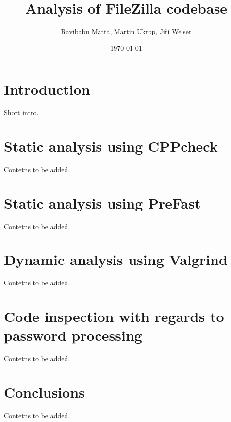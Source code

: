 \documentclass[11pt]{article}
\begin{document}
\title{Analysis of FileZilla codebase}
\date{\today}
\author{Ravibabu Matta, Martin Ukrop, Jiří Weiser}
\maketitle

\section{Introduction}

Short intro.

\section{Static analysis using CPPcheck}

Contetns to be added.

\section{Static analysis using PreFast}

Contetns to be added.

\section{Dynamic analysis using Valgrind}

Contetns to be added.

\section{Code inspection with regards to password processing}

Contetns to be added.

\section{Conclusions}

Contetns to be added.
\end{document}
